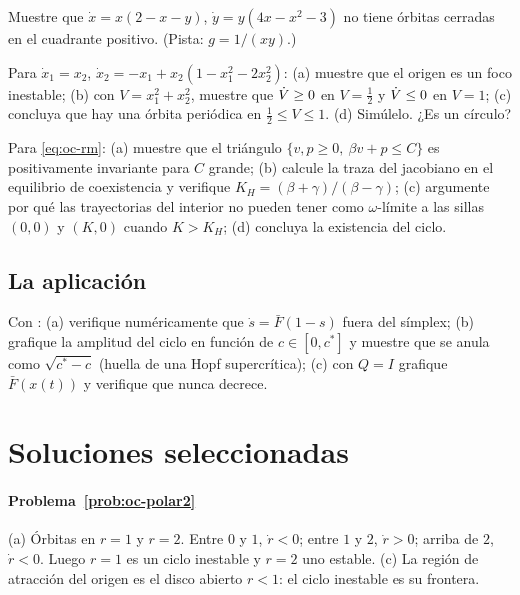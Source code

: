 \begin{problema}[Dulac]\label{prob:oc-dulac}
Muestre que $\dot x=x(2-x-y)$, $\dot y=y(4x-x^2-3)$ no tiene órbitas cerradas en el cuadrante positivo. (Pista: $g=1/(xy)$.)
\end{problema}

\begin{problema}\label{prob:oc-pb}
Para $\dot x_1=x_2$, $\dot x_2=-x_1+x_2(1-x_1^2-2x_2^2)$: (a) muestre que el origen es un foco inestable; (b) con $V=x_1^2+x_2^2$, muestre que $\dot V\ge0$ en $V=\tfrac12$ y $\dot V\le0$ en $V=1$; (c) concluya que hay una órbita periódica en $\tfrac12\le V\le1$. (d) \etiquetaM{} Simúlelo. ¿Es un círculo?
\end{problema}

\begin{problema}\label{prob:oc-rm}
\etiquetaEstrella{} Para \eqref{eq:oc-rm}: (a) muestre que el triángulo $\{v,p\ge0,\ \beta v+p\le C\}$ es positivamente invariante para $C$ grande; (b) calcule la traza del jacobiano en el equilibrio de coexistencia y verifique $K_H=(\beta+\gamma)/(\beta-\gamma)$; (c) argumente por qué las trayectorias del interior no pueden tener como $\omega$-límite a las sillas $(0,0)$ y $(K,0)$ cuando $K>K_H$; (d) concluya la existencia del ciclo.
\end{problema}

\subsection*{La aplicación}

\begin{problema}[Nowak]\label{prob:oc-nowak}
\etiquetaM{} Con : (a) verifique numéricamente que $\dot s=\bar F(1-s)$ fuera del símplex; (b) grafique la amplitud del ciclo en función de $c\in[0,c^*]$ y muestre que se anula como $\sqrt{c^*-c}$ (huella de una Hopf supercrítica); (c) con $Q=I$ grafique $\bar F(x(t))$ y verifique que nunca decrece.
\end{problema}

\section{Soluciones seleccionadas}

\paragraph{Problema~\ref{prob:oc-polar2}}
(a) Órbitas en $r=1$ y $r=2$. Entre $0$ y $1$, $\dot r<0$; entre $1$ y $2$, $\dot r>0$; arriba de $2$, $\dot r<0$. Luego $r=1$ es un ciclo inestable y $r=2$ uno estable. (c) La región de atracción del origen es el disco abierto $r<1$: el ciclo inestable es su frontera.

